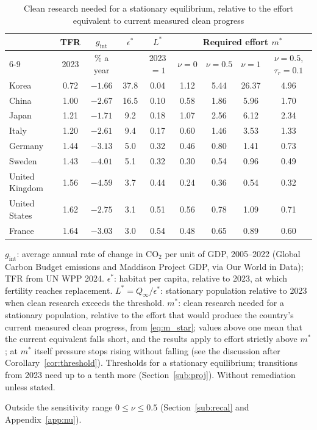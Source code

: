 \documentclass[11pt]{article}
\begin{document}
\begin{table}[h!]\centering
\begin{threeparttable}
\caption{Clean research needed for a stationary equilibrium, relative to the effort equivalent to current measured clean progress}
\label{tab:thresholds}
\label{tab:gaps}
\footnotesize
\setlength{\tabcolsep}{4.5pt}
\begin{tabular}{lcccccccc}
\toprule
 & TFR & $g_{\text{int}}$ & $\epsilon^\ast$ & $L^\ast$ & \multicolumn{4}{c}{Required effort $m^\ast$}\\
\cmidrule(lr){6-9}
 & 2023 & \% a year & & 2023 $=1$ & $\nu=0$ & $\nu=0.5$ & $\nu=1$\tnote{a} & $\nu=0.5$, $\tau_r=0.1$\\
\midrule
Korea          & 0.72 & $-1.66$ & 37.8 & 0.04 & 1.12 & 5.44 & 26.37 & 4.96\\
China          & 1.00 & $-2.67$ & 16.5 & 0.10 & 0.58 & 1.86 & 5.96 & 1.70\\
Japan          & 1.21 & $-1.71$ & 9.2 & 0.18 & 1.07 & 2.56 & 6.12 & 2.34\\
Italy          & 1.20 & $-2.61$ & 9.4 & 0.17 & 0.60 & 1.46 & 3.53 & 1.33\\
Germany        & 1.44 & $-3.13$ & 5.0 & 0.32 & 0.46 & 0.80 & 1.41 & 0.73\\
Sweden         & 1.43 & $-4.01$ & 5.1 & 0.32 & 0.30 & 0.54 & 0.96 & 0.49\\
United Kingdom & 1.56 & $-4.59$ & 3.7 & 0.44 & 0.24 & 0.36 & 0.54 & 0.32\\
United States  & 1.62 & $-2.75$ & 3.1 & 0.51 & 0.56 & 0.78 & 1.09 & 0.71\\
France         & 1.64 & $-3.03$ & 3.0 & 0.54 & 0.48 & 0.65 & 0.89 & 0.60\\
\bottomrule
\end{tabular}
\begin{tablenotes}\footnotesize
\item $g_{\text{int}}$: average annual rate of change in CO$_2$ per unit of GDP, 2005--2022 (Global Carbon
Budget emissions and Maddison Project GDP, via Our World in Data); TFR from UN WPP 2024. $\epsilon^\ast$: habitat per capita, relative to 2023, at which fertility
reaches replacement. $L^\ast=Q_\infty/\epsilon^\ast$: stationary population relative to 2023 when clean
research exceeds the threshold. $m^\ast$: clean research needed for a stationary population, relative to
the effort that would produce the country's current measured clean progress, from \eqref{eq:m_star};
values above one mean that the current equivalent falls short, and the results apply to effort
strictly above $m^\ast$; at $m^\ast$ itself pressure stops rising without falling (see the discussion after
Corollary~\ref{cor:threshold}). Thresholds for a stationary equilibrium;
transitions from 2023 need up to a tenth more (Section~\ref{sub:proj}). Without remediation unless stated.
\item[a] Outside the sensitivity range $0\le\nu\le0.5$ (Section~\ref{sub:recal} and Appendix~\ref{app:nu}).
\end{tablenotes}
\end{threeparttable}
\end{table}
\end{document}
